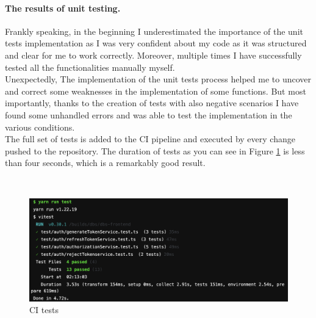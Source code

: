 \paragraph*{The results of unit testing.} Frankly speaking, in the beginning I underestimated the importance of the unit tests implementation as I was very confident about my code as it was structured and clear for me to work correctly. Moreover, multiple times I have successfully tested all the functionalities manually myself.\\
Unexpectedly, The implementation of the unit tests process helped me to uncover and correct some weaknesses in the implementation of some functions. But most importantly, thanks to the creation of tests with also negative scenarios I have found some unhandled errors and was able to test the implementation in the various conditions.\\
The full set of tests is added to the CI pipeline and executed by every change pushed to the repository. The duration of tests as you can see in Figure \ref{img:test} is less than four seconds, which is a remarkably good result.

 \

\begin{figure}[h]
\centering
\includegraphics[scale=0.47]{../png/tests.png}
\caption{CI tests}\label{picture:tests}
\label{img:test}
\end{figure}

